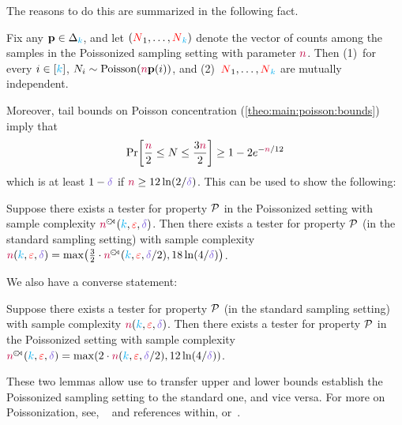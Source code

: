 The reasons to do this are summarized in the following fact.
\begin{fact}
Fix any $\mathbf{p}\in\Delta_{{\textcolor{cyan}{k}}}$, and let $(\textcolor{red}{N}_1,\dots,\textcolor{red}{N}_{\textcolor{cyan}{k}})$ denote the vector of counts among the samples in the Poissonized sampling setting with parameter ${\textcolor{purple}{n}}$. Then (1)~for every $i\in[{\textcolor{cyan}{k}}]$, $N_i\sim\poisson{\ns\p(i)}$, and (2)~$\textcolor{red}{N}_1,\dots,\textcolor{red}{N}_{\textcolor{cyan}{k}}$ are mutually independent.
\end{fact}
Moreover, tail bounds on Poisson concentration (\cref{theo:main:poisson:bounds}) imply that
\begin{equation}
	\bPr{ \frac{\ns}{2} \leq N \leq \frac{3\ns}{2}} \geq 1-2e^{-\ns/12}
\end{equation}
which is at least $1-\errprob$ if $\ns \geq 12\ln(2/\errprob)$. This can be used to show the following:
\begin{lemma}
	Suppose there exists a tester for property $\mathcal{P}$ in the Poissonized setting with sample complexity $\ns^{\fish}(\ab,\dst,\errprob)$. Then there exists a tester for property $\mathcal{P}$ (in the standard sampling setting) with sample complexity $\ns(\ab,\dst,\errprob)=\max\Paren{\frac{3}{2}\cdot \ns^{\fish}(\ab,\dst,\errprob/2), 18\ln(4/\errprob)}$.
\end{lemma}
\noindent We also have a converse statement:
\begin{lemma}
	Suppose there exists a tester for property $\mathcal{P}$ (in the standard sampling setting) with sample complexity $\ns(\ab,\dst,\errprob)$. Then there exists a tester for property $\mathcal{P}$ in the Poissonized setting with sample complexity $\ns^{\fish}(\ab,\dst,\errprob)=\max\Paren{2\cdot \ns(\ab,\dst,\errprob/2), 12\ln(4/\errprob)}$.
\end{lemma}
These two lemmas allow use to transfer upper and lower bounds establish the Poissonized sampling setting to the standard one, and vice versa. For more on Poissonization, see, \eg~\citet[Section~4.3]{Valiant:11} and references within, or~\citet[Appendix~D.3]{Canonne:15:Survey}.